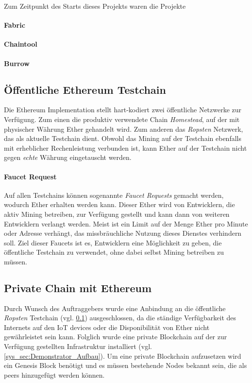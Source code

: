 Zum Zeitpunkt des Starts dieses Projekts waren die Projekte 
\paragraph{Fabric}
\paragraph{Chaintool}
\paragraph{Burrow}

\subsection{Öffentliche Ethereum Testchain}
\label{subsec:oeffentliche_testchain}
Die Ethereum Implementation stellt hart-kodiert zwei öffentliche Netzwerke zur Verfügung. Zum einen die produktiv verwendete Chain \emph{Homestead}, auf der mit physischer Währung Ether gehandelt wird\cite[{Kapitel Ether}]{ethereum-homestead.readthedocs.io}. Zum anderen das \emph{Ropsten} Netzwerk, das als aktuelle Testchain dient. Obwohl das Mining auf der Testchain ebenfalls mit erheblicher Rechenleistung verbunden ist, kann Ether auf der Testchain nicht gegen \emph{echte} Währung eingetauscht werden.

\paragraph{Faucet Request}
\label{para:Faucet_Request}
Auf allen Testchains können sogenannte \emph{Faucet Requests} gemacht werden, wodurch Ether erhalten werden kann. Dieser Ether wird von Entwicklern, die aktiv Mining betreiben, zur Verfügung gestellt und kann dann von weiteren Entwicklern verlangt werden. Meist ist ein Limit auf der Menge Ether pro Minute oder Adresse verhängt, das missbräuchliche Nutzung dieses Dienstes verhindern soll. Ziel dieser Faucets ist es, Entwicklern eine Möglichkeit zu geben, die öffentliche Testchain zu verwendet, ohne dabei selbst Mining betreiben zu müssen.\cite{blog.b9lab.com/faucet,ethereum.stackexchange.com/faucets}

\subsection{Private Chain mit Ethereum}
\label{subsec:private_chain}
Durch Wunsch des Auftraggebers wurde eine Anbindung an die öffentliche \emph{Ropsten} Testchain (vgl. \ref{subsec:oeffentliche_testchain}) ausgeschlossen, da die ständige Verfügbarkeit des Internets auf den IoT devices oder die Disponibilität von Ether nicht gewährleistet sein kann. Folglich wurde eine private Blockchain auf der zur Verfügung gestellten Infrastruktur installiert (vgl. \ref{sys_sec:Demonstrator_Aufbau}). Um eine private Blockchain aufzusetzen wird ein Genesis Block benötigt und es müssen bestehende Nodes bekannt sein, die als peers hinzugefügt werden können.

